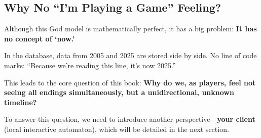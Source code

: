 \subsection{Why No ``I'm Playing a Game'' Feeling?}

Although this God model is mathematically perfect, it has a big problem: \textbf{It has no concept of `now.'}

In the database, data from 2005 and 2025 are stored side by side. No line of code marks: ``Because we're reading this line, it's now 2025.''

This leads to the core question of this book:
\textbf{Why do we, as players, feel not seeing all endings simultaneously, but a unidirectional, unknown timeline?}

To answer this question, we need to introduce another perspective---\textbf{your client} (local interactive automaton), which will be detailed in the next section.
